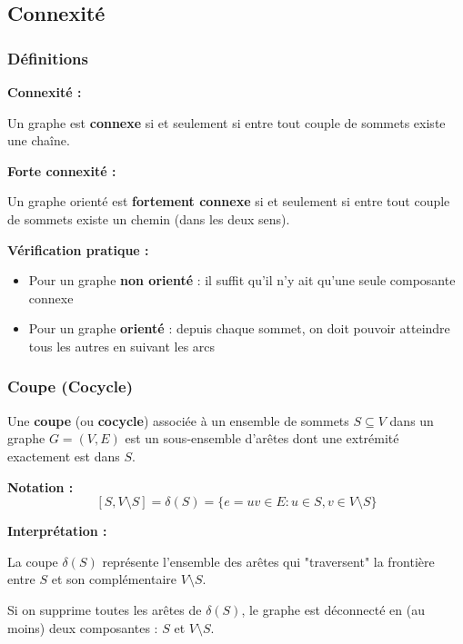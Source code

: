 \documentclass[12pt,a4paper]{article}
\begin{document}
\newpage
\subsection{Connexité}

\subsubsection{Définitions}

\begin{definition}
\textbf{Connexité :}

Un graphe est \textcolor{titrebleu}{\textbf{connexe}} si et seulement si entre tout couple de sommets existe une chaîne.

\textbf{Forte connexité :}

Un graphe orienté est \textcolor{defvert}{\textbf{fortement connexe}} si et seulement si entre tout couple de sommets existe un chemin (dans les deux sens).
\end{definition}

\begin{astuce}
\textbf{Vérification pratique :}
\begin{itemize}
    \item Pour un graphe \textbf{non orienté} : il suffit qu'il n'y ait qu'une seule composante connexe
    \item Pour un graphe \textbf{orienté} : depuis chaque sommet, on doit pouvoir atteindre tous les autres en suivant les arcs
\end{itemize}
\end{astuce}

\subsubsection{Coupe (Cocycle)}

\begin{definition}
Une \textcolor{titrebleu}{\textbf{coupe}} (ou \textbf{cocycle}) associée à un ensemble de sommets $S \subseteq V$ dans un graphe $G = (V, E)$ est un sous-ensemble d'arêtes dont une extrémité exactement est dans $S$.

\textbf{Notation :}
$$[S, V \setminus S] = \delta(S) = \{e = uv \in E : u \in S, v \in V \setminus S\}$$
\end{definition}

\begin{notecours}
\textbf{Interprétation :}

La coupe $\delta(S)$ représente l'ensemble des arêtes qui "traversent" la frontière entre $S$ et son complémentaire $V \setminus S$.

Si on supprime toutes les arêtes de $\delta(S)$, le graphe est déconnecté en (au moins) deux composantes : $S$ et $V \setminus S$.
\end{notecours}
\end{document}
